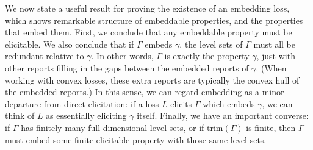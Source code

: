 \documentclass[12pt]{article}
\newcommand{\trim}{\mathrm{trim}}
\begin{document}
We now state a useful result for proving the existence of an embedding loss, which shows remarkable structure of embeddable properties, and the properties that embed them.
First, we conclude that any embeddable property must be elicitable.
We also conclude that if $\Gamma$ embeds $\gamma$, the level sets of $\Gamma$ must all be redundant relative to $\gamma$.
In other words, $\Gamma$ is exactly the property $\gamma$, just with other reports filling in the gaps between the embedded reports of $\gamma$.
(When working with convex losses, these extra reports are typically the convex hull of the embedded reports.)
In this sense, we can regard embedding as a minor departure from direct elicitation: if a loss $L$ elicits $\Gamma$ which embeds $\gamma$, we can think of $L$ as essentially eliciting $\gamma$ itself.
Finally, we have an important converse: if $\Gamma$ has finitely many full-dimensional level sets, or if $\trim(\Gamma)$ is finite, then $\Gamma$ must embed some finite elicitable property with those same level sets.
\end{document}
